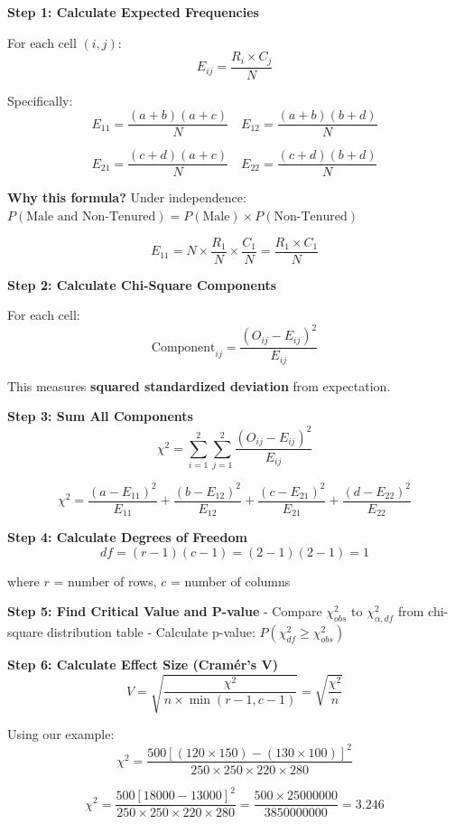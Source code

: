 \documentclass[11pt]{article}
\begin{document}
\textbf{Step 1: Calculate Expected Frequencies}

For each cell \((i,j)\): \[E_{ij} = \frac{R_i \times C_j}{N}\]

Specifically:
\[E_{11} = \frac{(a+b)(a+c)}{N} \quad E_{12} = \frac{(a+b)(b+d)}{N}\]

\[E_{21} = \frac{(c+d)(a+c)}{N} \quad E_{22} = \frac{(c+d)(b+d)}{N}\]

\textbf{Why this formula?} Under independence:
\(P(\text{Male and Non-Tenured}) = P(\text{Male}) \times P(\text{Non-Tenured})\)

\[E_{11} = N \times \frac{R_1}{N} \times \frac{C_1}{N} = \frac{R_1 \times C_1}{N}\]

\textbf{Step 2: Calculate Chi-Square Components}

For each cell:
\[\text{Component}_{ij} = \frac{(O_{ij} - E_{ij})^2}{E_{ij}}\]

This measures \textbf{squared standardized deviation} from expectation.

\textbf{Step 3: Sum All Components}
\[\chi^2 = \sum_{i=1}^{2}\sum_{j=1}^{2} \frac{(O_{ij} - E_{ij})^2}{E_{ij}}\]

\[\chi^2 = \frac{(a - E_{11})^2}{E_{11}} + \frac{(b - E_{12})^2}{E_{12}} + \frac{(c - E_{21})^2}{E_{21}} + \frac{(d - E_{22})^2}{E_{22}}\]

\textbf{Step 4: Calculate Degrees of Freedom}
\[df = (r-1)(c-1) = (2-1)(2-1) = 1\]

where \(r\) = number of rows, \(c\) = number of columns

\textbf{Step 5: Find Critical Value and P-value} - Compare
\(\chi^2_{obs}\) to \(\chi^2_{\alpha, df}\) from chi-square distribution
table - Calculate p-value: \(P(\chi^2_{df} \geq \chi^2_{obs})\)

\textbf{Step 6: Calculate Effect Size (Cramér's V)}
\[V = \sqrt{\frac{\chi^2}{n \times \min(r-1, c-1)}} = \sqrt{\frac{\chi^2}{n}}\]

Using our example:
\[\chi^2 = \frac{500[(120 \times 150) - (130 \times 100)]^2}{250 \times 250 \times 220 \times 280}\]

\[\chi^2 = \frac{500[18000 - 13000]^2}{250 \times 250 \times 220 \times 280} = \frac{500 \times 25000000}{3850000000} = 3.246\]
\end{document}
